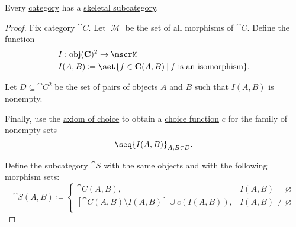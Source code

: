\begin{theorem}\label{thm:skeletal_subcategory_existence}
  Every \hyperref[def:category]{category} has a \hyperref[def:skeletal_category]{skeletal subcategory}.
\end{theorem}
\begin{proof}
  Fix category \( \cat{C} \). Let \( \mscrM \) be the set of all morphisms of \( \cat{C} \). Define the function
  \begin{equation*}
    \begin{aligned}
      &I: \obj(\cat{C})^2 \to \mscrM \\
      &I(A, B) \coloneqq \set{ f \in \cat{C}(A, B) \given f \T{is an isomorphism} }.
    \end{aligned}
  \end{equation*}

  Let \( D \subseteq \cat{C}^2 \) be the set of pairs of objects \( A \) and \( B \) such that \( I(A, B) \) is nonempty.

  Finally, use the \hyperref[def:zfc/choice]{axiom of choice} to obtain a \hyperref[def:choice_function]{choice function} \( c \) for the family of nonempty sets
  \begin{equation*}
    \seq{ I(A, B) }_{A, B \in D}.
  \end{equation*}

  Define the subcategory \( \cat{S} \) with the same objects and with the following morphism sets:
  \begin{equation*}
    \cat{S}(A, B) \coloneqq \begin{cases}
      \cat{C}(A, B),                                     &I(A, B) = \varnothing \\
      [\cat{C}(A, B) \setminus I(A, B)] \cup c(I(A, B)), &I(A, B) \neq \varnothing \\
    \end{cases}
  \end{equation*}
\end{proof}
